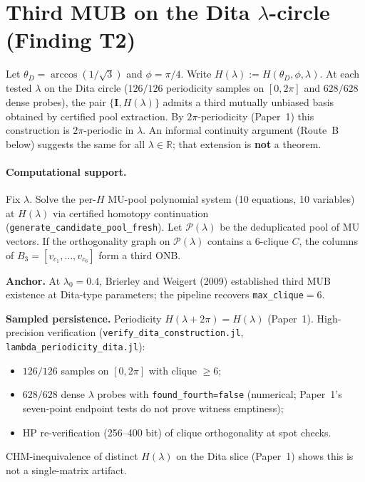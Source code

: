 
\section{Third MUB on the Dita \texorpdfstring{$\lambda$}{lambda}-circle (Finding T2)}
\label{sec:proof-t2}

\begin{finding}
\label{thm:T2}
Let $\theta_D=\arccos(1/\sqrt3)$ and $\phi=\pi/4$.
Write $H(\lambda):=H(\theta_D,\phi,\lambda)$.
At each tested $\lambda$ on the Dita circle ($126/126$ periodicity samples on $[0,2\pi]$ and $628/628$ dense probes), the pair $\{\mathbf{I},H(\lambda)\}$ admits a third mutually unbiased basis obtained by certified pool extraction.
By $2\pi$-periodicity (Paper~1) this construction is $2\pi$-periodic in $\lambda$.
An informal continuity argument (Route~B below) suggests the same for all $\lambda\in\mathbb{R}$; that extension is \textbf{not} a theorem.
\end{finding}

\paragraph{Computational support.}
Fix $\lambda$.
Solve the per-$H$ MU-pool polynomial system (10 equations, 10 variables) at $H(\lambda)$
via certified homotopy continuation (\texttt{generate\_candidate\_pool\_fresh}).
Let $\mathcal{P}(\lambda)$ be the deduplicated pool of MU vectors.
If the orthogonality graph on $\mathcal{P}(\lambda)$ contains a $6$-clique $C$, the columns of $B_3=[v_{c_1},\ldots,v_{c_6}]$ form a third ONB.

\textbf{Anchor.} At $\lambda_0=0.4$, Brierley and Weigert (2009) established third MUB existence at Dita-type parameters; the pipeline recovers \texttt{max\_clique}$=6$.

\textbf{Sampled persistence.} Periodicity $H(\lambda+2\pi)=H(\lambda)$ (Paper~1). High-precision verification
(\texttt{verify\_dita\_construction.jl}, \texttt{lambda\_periodicity\_dita.jl}):
\begin{itemize}
    \item $126/126$ samples on $[0,2\pi]$ with clique $\ge6$;
    \item $628/628$ dense $\lambda$ probes with \texttt{found\_fourth=false} (numerical; Paper~1's seven-point endpoint tests do not prove witness emptiness);
    \item HP re-verification (256--400 bit) of clique orthogonality at spot checks.
\end{itemize}
CHM-inequivalence of distinct $H(\lambda)$ on the Dita slice (Paper~1) shows this is not a single-matrix artifact.

